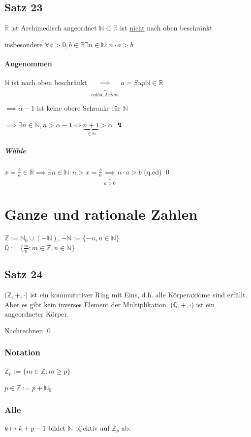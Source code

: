 \documentclass[fleqn]{scrbook}
\renewenvironment{proof}{{\bfseries Beweis }}{\qed}
\begin{document}
\subsection{Satz 23} $\mathbb{R}$ ist Archimedisch angeordnet $\mathbb{N} \subset \mathbb{R}$ ist \underline{nicht} nach oben beschränkt

insbesondere $\forall a > 0, b \in \mathbb{R} \exists n \in \mathbb{N}: n  \cdot  a > b$

\begin{proof}
\paragraph*{Angenommen} $\mathbb{N}$ ist nach oben beschränkt $\underbrace{\implies}_{vollst. Axiom} a = Sup\mathbb{N}\in\mathbb{R}$

$\implies \alpha - 1$ ist keine obere Schranke für $\mathbb{N}$

$\implies \exists n \in \mathbb{N}, n > \alpha - 1 \iff  \underbrace{n+1}_{\in \mathbb{N}} > \alpha$ $\lightning$
\subparagraph{Wähle}
$x = \frac{b}{a} \in \mathbb{R} \implies \exists n \in \mathbb{N}: n > x = \frac{b}{a} \underbrace{\implies}_{a > 0} n \cdot  a > b$ (q.ed)
\end{proof}
\section{Ganze und rationale Zahlen}
$\mathbb{Z} := \mathbb{N}_0 \cup (-\mathbb{N}), -\mathbb{N} := \{-n, n \in \mathbb{N}\}$\\$\mathbb{Q}:=\{\frac{m}{n}: m\in\mathbb{Z},n \in\mathbb{N}\}$
\subsection{Satz 24}
($\mathbb{Z}, +,  \cdot $) ist ein kommutativer Ring mit Eins, d.h. alle Körperaxiome sind erfüllt. Aber es gibt kein inverses Element der Multiplikation. ($\mathbb{Q}, +,  \cdot $) ist ein angeordneter Körper.

\begin{proof}
	Nachrechnen
\end{proof}
\subsubsection{Notation}$\mathbb{Z}_p := \{ m\in\mathbb{Z}: m\geq p\}$

$p \in \mathbb{Z} := p + \mathbb{N}_0$
\subsubsection{Alle} $k \mapsto k + p - 1$ bildet $\mathbb{N}$ bijektiv auf $\mathbb{Z}_p$ ab.
\end{document}
